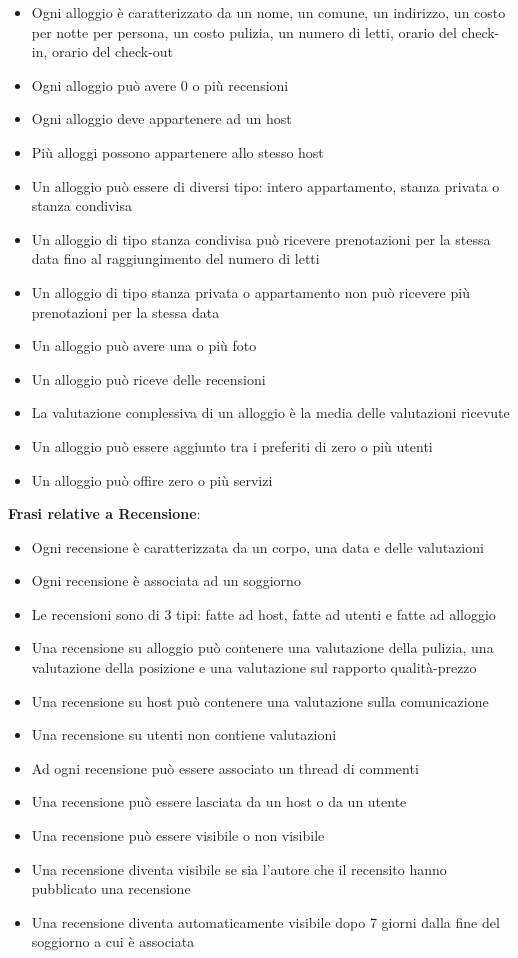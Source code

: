 \begin{itemize}
    \item Ogni alloggio è caratterizzato da un nome, un comune, un indirizzo, un costo per notte per persona, un costo pulizia, un numero di letti, orario del check-in, orario del check-out
    \item Ogni alloggio può avere 0 o più recensioni
    \item Ogni alloggio deve appartenere ad un host
    \item Più alloggi possono appartenere allo stesso host
    \item Un alloggio può essere di diversi tipo: intero appartamento, stanza privata o stanza condivisa
    \item Un alloggio di tipo stanza condivisa può ricevere prenotazioni per la stessa data fino al raggiungimento del numero di letti
    \item Un alloggio di tipo stanza privata o appartamento non può ricevere più prenotazioni per la stessa data
    \item Un alloggio può avere una o più foto
    \item Un alloggio può riceve delle recensioni
    \item La valutazione complessiva di un alloggio è la media delle valutazioni ricevute
    \item Un alloggio può essere aggiunto tra i preferiti di zero o più utenti
    \item Un alloggio può offire zero o più servizi
\end{itemize}
\bigskip
\textbf{Frasi relative a Recensione}:
\begin{itemize}
    \item Ogni recensione è caratterizzata da un corpo, una data e delle valutazioni
    \item Ogni recensione è associata ad un soggiorno
    \item Le recensioni sono di 3 tipi: fatte ad host, fatte ad utenti e fatte ad alloggio
    \item Una recensione su alloggio può contenere una valutazione della pulizia, una valutazione della posizione e una valutazione sul rapporto qualità-prezzo
    \item Una recensione su host può contenere una valutazione sulla comunicazione
    \item Una recensione su utenti non contiene valutazioni
    \item Ad ogni recensione può essere associato un thread di commenti
    \item Una recensione può essere lasciata da un host o da un utente
    \item Una recensione può essere visibile o non visibile
    \item Una recensione diventa visibile se sia l'autore che il recensito hanno pubblicato una recensione
    \item Una recensione diventa automaticamente visibile dopo 7 giorni dalla fine del soggiorno a cui è associata
\end{itemize}
